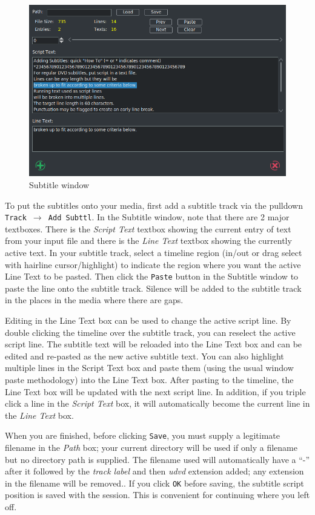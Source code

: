 \begin{figure}[htpb]
    \centering
    \includegraphics[width=0.8\linewidth]{images/subtitle01.png}
    \caption{Subtitle window}
    \label{fig:subtitle01}
\end{figure}

To put the subtitles onto your media, first add a subtitle track via the pulldown  \texttt{Track $\rightarrow$ Add Subttl}. In the Subtitle window, note that there are 2 major textboxes.  There is the \textit{Script Text} textbox showing the current entry of text from your input file and there is the \textit{Line Text} textbox showing the currently active text.  In your subtitle track, select a timeline region (in/out or drag select with hairline cursor/highlight) to indicate the region where you want the active Line Text to be pasted.  Then click the \texttt{Paste} button in the Subtitle window to paste the line onto the subtitle track.  Silence will be added to the subtitle track in the places in the media where there are gaps.

Editing in the Line Text box can be used to change the active script line. By double clicking the timeline over the subtitle track, you can reselect the active script line.  The subtitle text will be reloaded into the Line Text box and can be edited and re-pasted as the new active subtitle text.  You can also highlight multiple lines in the Script Text box and paste them (using the usual window paste methodology) into the Line Text box.  After pasting to the timeline, the Line Text box will be updated with the next script line.  In addition, if you triple click a line in the \textit{Script Text} box, it will automatically become the current line in the \textit{Line Text} box.

When you are finished, before clicking \texttt{Save}, you must supply a legitimate filename in the \textit{Path} box; your current directory will be used if only a filename but no directory path is supplied.  The filename used will automatically have a “-” after it followed by the \textit{track label} and then \textit{udvd} extension added; any extension in the filename will be removed..  If you click \texttt{OK} before saving, the subtitle script position is saved with the session.  This is convenient for continuing where you left off.

